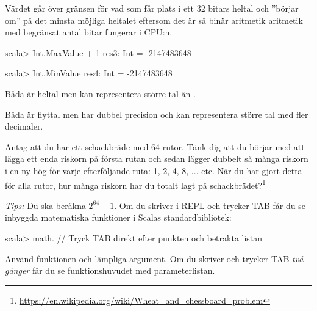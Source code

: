\TaskSolved \what

\SubtaskSolved

\begin{ConceptConnections}

\end{ConceptConnections}

\SubtaskSolved Värdet går över gränsen för vad som får plats i ett 32 bitars heltal och ''börjar om'' på det minsta möjliga heltalet  eftersom det är så binär aritmetik aritmetik med begränsat antal bitar fungerar i CPU:n.
\begin{REPL}
scala> Int.MaxValue + 1
res3: Int = -2147483648

scala> Int.MinValue
res4: Int = -2147483648
\end{REPL}

\SubtaskSolved Båda är heltal men  kan representera större tal än .

\SubtaskSolved Båda är flyttal men  har dubbel precision och kan representera större tal med fler decimaler.



\QUESTEND






\QUESTBEGIN

\Task \what

\Subtask Antag att du har ett schackbräde med 64 rutor. Tänk dig att du börjar med att lägga ett enda riskorn på första rutan och sedan lägger dubbelt så många riskorn i en ny hög för varje efterföljande ruta: 1, 2, 4, 8, ...  etc. När du har gjort detta för alla rutor, hur många riskorn har du totalt lagt på schackbrädet?\footnote{\url{https://en.wikipedia.org/wiki/Wheat_and_chessboard_problem}}

\emph{Tips:} Du ska beräkna $2^{64} - 1$. Om du skriver  i REPL och trycker TAB får du se inbyggda matematiska funktioner i Scalas standardbibliotek:
\begin{REPLnonum}
scala> math.    // Tryck TAB direkt efter punkten och betrakta listan
\end{REPLnonum}
Använd funktionen  och lämpliga argument. Om du skriver  och trycker TAB \emph{två gånger} får du se funktionshuvudet med parameterlistan.

